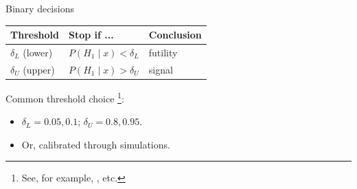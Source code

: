 \documentclass[11pt
,fragile=singleslide
,xcolor=dvipsnames
]{beamer}
\begin{document}
\begin{frame}{Binary decisions}
%		

	\begin{table}
	\centering
	\begin{tabular}{lll}
		\toprule
		Threshold & Stop if ...  & Conclusion\\
		\midrule
		$\delta_L$ (lower) & $P(H_1 \mid x) < \delta_L$ &   futility \\
		$\delta_U$ (upper) & $P(H_1 \mid x) > \delta_U$  &  signal \\
		\bottomrule
	\end{tabular}
	
	\end{table}

\pause
\vspace{0.15in}
Common threshold choice \footnote{See, for example, \cite{thall1995bayesian,smith2006implementation,zhou2008bayesian,berry2010bayesian,li2020bayesian}, etc.}:
\begin{itemize}
	\item $\delta_L = 0.05, 0.1$; $\delta_U = 0.8, 0.95$.
	\item Or, calibrated through simulations.
\end{itemize}
	
\end{frame}
\end{document}
